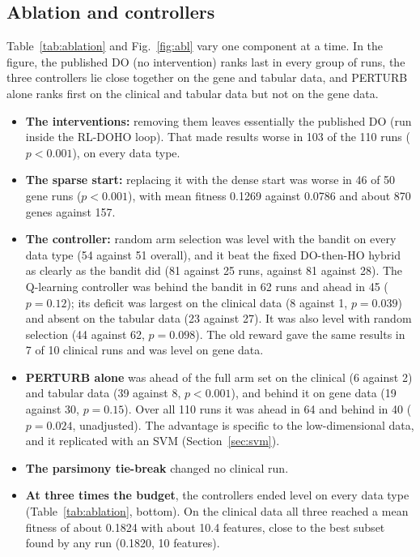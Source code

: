 \documentclass[journal]{IEEEtran}
\begin{document}
\subsection{Ablation and controllers}\label{sec:ablation}
Table~\ref{tab:ablation} and Fig.~\ref{fig:abl} vary one component at a time. In the figure, the published DO (no intervention) ranks last in every group of runs, the three controllers lie close together on the gene and tabular data, and PERTURB alone ranks first on the clinical and tabular data but not on the gene data.
\begin{itemize}
\item \textbf{The interventions:} removing them leaves essentially the published DO (run inside the RL-DOHO loop). That made results worse in 103 of the 110 runs ($p<0.001$), on every data type.
\item \textbf{The sparse start:} replacing it with the dense start was worse in 46 of 50 gene runs ($p<0.001$), with mean fitness 0.1269 against 0.0786 and about 870 genes against 157.
\item \textbf{The controller:} random arm selection was level with the bandit on every data type (54 against 51 overall), and it beat the fixed DO-then-HO hybrid as clearly as the bandit did (81 against 25 runs, against 81 against 28). The Q-learning controller was behind the bandit in 62 runs and ahead in 45 ($p=0.12$); its deficit was largest on the clinical data (8 against 1, $p=0.039$) and absent on the tabular data (23 against 27). It was also level with random selection (44 against 62, $p=0.098$). The old reward gave the same results in 7 of 10 clinical runs and was level on gene data.
\item \textbf{PERTURB alone} was ahead of the full arm set on the clinical (6 against 2) and tabular data (39 against 8, $p<0.001$), and behind it on gene data (19 against 30, $p=0.15$). Over all 110 runs it was ahead in 64 and behind in 40 ($p=0.024$, unadjusted). The advantage is specific to the low-dimensional data, and it replicated with an SVM (Section~\ref{sec:svm}).
\item \textbf{The parsimony tie-break} changed no clinical run.
\item \textbf{At three times the budget}, the controllers ended level on every data type (Table~\ref{tab:ablation}, bottom). On the clinical data all three reached a mean fitness of about 0.1824 with about 10.4 features, close to the best subset found by any run (0.1820, 10 features).
\end{itemize}
\end{document}
